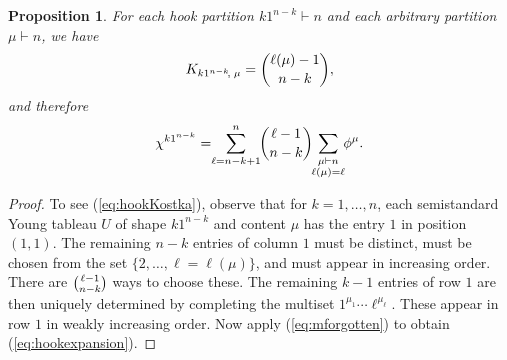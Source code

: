 \documentclass[12pt]{amsart}
\newtheorem{prop}[thm]{Proposition}
\numberwithin{equation}{section}
\newcommand{\sumsb}[1]{\sum_{\substack{#1}}}  %
\newcommand{\ntnsp}{\negthinspace}
\newcommand{\ntksp}{\negthickspace}
\begin{document}
\begin{prop}\label{p:hookKostka}
  For each hook partition $k1^{n-k} \vdash n$
  and each arbitrary partition $\mu \vdash n$,
  we have
  \begin{equation}\label{eq:hookKostka}
    K_{k1^{n-k}\ntnsp,\;\mu} =
    \binom{\ell(\mu)-1}{n-k},
  \end{equation}
  and therefore
  \begin{equation}\label{eq:hookexpansion}
    \chi^{k1^{n-k}} = \ntksp \sum_{\ell = n-k+1}^n \ntksp \binom{\ell-1}{n-k}
    \ntksp \sumsb{\mu \vdash n\\\ell(\mu) = \ell} \ntksp \phi^\mu.
\end{equation}
\end{prop}
\begin{proof}
  To see (\ref{eq:hookKostka}), observe that for $k = 1,\dotsc,n$,
  each semistandard Young tableau $U$ of shape $k1^{n-k}$ and content $\mu$
  has the entry $1$ in position $(1,1)$.
  The remaining $n-k$ entries of column $1$ must be distinct,
  must be chosen from the set $\{2,\dotsc,\ell = \ell(\mu)\}$, and
  must appear in increasing order.
  There are $\tbinom{\ell-1}{n-k}$ ways to choose these.
  The remaining $k-1$ entries of row $1$ are then uniquely determined by
  completing the multiset $1^{\mu_1} \cdots \ell^{\mu_\ell}$.  
  These appear
  in row $1$ in weakly increasing order.  Now apply (\ref{eq:mforgotten})
  to obtain (\ref{eq:hookexpansion}).
\end{proof}
\end{document}
